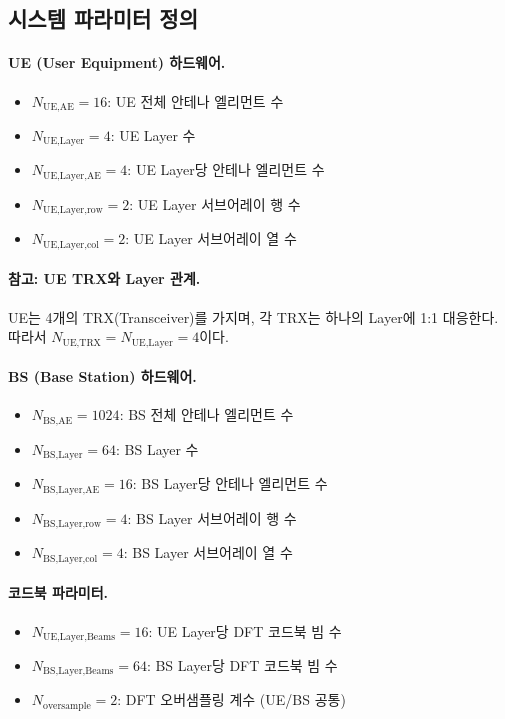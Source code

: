 \documentclass[10pt]{article}
\begin{document}
\subsection{시스템 파라미터 정의}

\paragraph{UE (User Equipment) 하드웨어.}
\begin{itemize}
    \item $N_{\text{UE,AE}} = 16$: UE 전체 안테나 엘리먼트 수
    \item $N_{\text{UE,Layer}} = 4$: UE Layer 수
    \item $N_{\text{UE,Layer,AE}} = 4$: UE Layer당 안테나 엘리먼트 수
    \item $N_{\text{UE,Layer,row}} = 2$: UE Layer 서브어레이 행 수
    \item $N_{\text{UE,Layer,col}} = 2$: UE Layer 서브어레이 열 수
\end{itemize}

\paragraph{참고: UE TRX와 Layer 관계.}
UE는 4개의 TRX(Transceiver)를 가지며, 각 TRX는 하나의 Layer에 1:1 대응한다. 따라서 $N_{\text{UE,TRX}} = N_{\text{UE,Layer}} = 4$이다.

\paragraph{BS (Base Station) 하드웨어.}
\begin{itemize}
    \item $N_{\text{BS,AE}} = 1024$: BS 전체 안테나 엘리먼트 수
    \item $N_{\text{BS,Layer}} = 64$: BS Layer 수
    \item $N_{\text{BS,Layer,AE}} = 16$: BS Layer당 안테나 엘리먼트 수
    \item $N_{\text{BS,Layer,row}} = 4$: BS Layer 서브어레이 행 수
    \item $N_{\text{BS,Layer,col}} = 4$: BS Layer 서브어레이 열 수
\end{itemize}

\paragraph{코드북 파라미터.}
\begin{itemize}
    \item $N_{\text{UE,Layer,Beams}} = 16$: UE Layer당 DFT 코드북 빔 수
    \item $N_{\text{BS,Layer,Beams}} = 64$: BS Layer당 DFT 코드북 빔 수
    \item $N_{\text{oversample}} = 2$: DFT 오버샘플링 계수 (UE/BS 공통)
\end{itemize}
\end{document}
